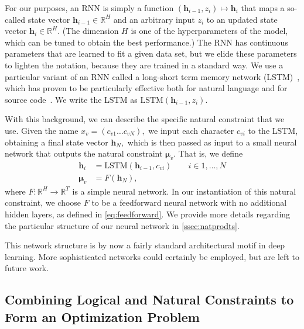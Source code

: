 \documentclass[sigplan,10pt,anonymous]{acmart} %
\theoremstyle{plain}
\theoremstyle{remark}
\theoremstyle{definition}
\begin{document}
For our purposes, an RNN is simply a function $(\bm{h}_{i-1}, z_i) \mapsto \bm{h}_{i}$
that maps a so-called state vector $\bm{h}_{i-1} \in \mathbb{R}^H$
and an arbitrary input $z_i$ to an updated state vector $\bm{h}_{i}  \in \mathbb{R}^H$.
(The dimension $H$ is one of the hyperparameters of the model, which can be tuned
to obtain the best performance.)
The RNN has continuous parameters that are learned to fit a given data set,
but we elide these parameters to lighten the notation, because they are trained in a standard way.
We use a particular variant of an RNN called a
long-short term memory network (LSTM)~\cite{hochreiter97},
which has proven to be particularly effective both for natural language
and for source code~\cite{sundermeyer2012,melis17,white2015,dam16}.
We write the LSTM as $\text{LSTM}(\bm{h}_{i-1}, z_i)$.

With this background, we can describe the specific natural constraint that we use.
Given the name $x_v = (c_{v1} \ldots c_{vN}),$ we input each character $c_{vi}$ to the LSTM,
obtaining a final state vector $\bm{h}_N,$ which is then passed as input to a small
neural network that outputs the natural constraint $\bm{\mu}_v$.
That is, we define
\begin{subequations}\label{eq:lstm}
  \begin{align}
    \bm{h}_i   & = \text{LSTM}(\bm{h}_{i-1}, c_{vi}) \qquad i \in 1, \ldots, N \\
    \bm{\mu}_v & = F(\bm{h}_N), \label{eq:lstmb}
  \end{align}
\end{subequations}
where $F: \mathbb{R}^H \rightarrow \mathbb{R}^T$ is a simple neural network.
In our instantiation of this natural constraint, we choose $F$ to be a feedforward neural network with
no additional hidden layers, as defined in \eqref{eq:feedforward}.
We provide more details regarding the particular structure of our neural network in \cref{ssec:natprodts}.

This network structure is by now a fairly standard architectural motif in deep learning.
More sophisticated networks could certainly be employed, but are left to future work.

\subsection{Combining Logical and Natural Constraints to Form an Optimization
  Problem} \label{ssec:optimisation}
\end{document}
